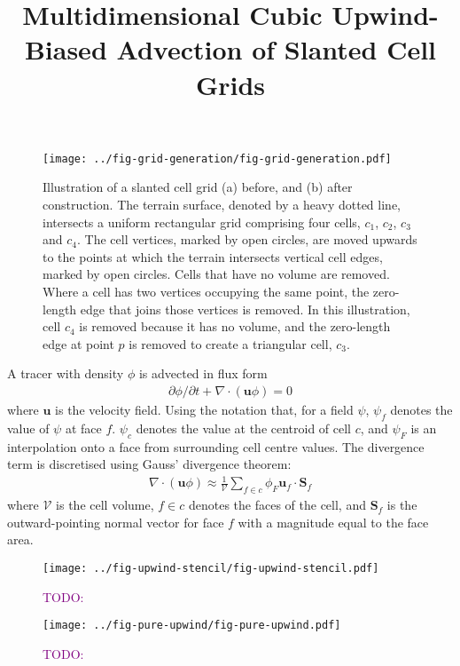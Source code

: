 \documentclass{article}
\title{Multidimensional Cubic Upwind-Biased Advection of Slanted Cell Grids}
\newcommand{\TODO}[1]{\textcolor{purple}{TODO: \emph{#1}}}
\begin{document}
\maketitle
\begin{figure}
	\centering
	\texttt{[image: ../fig-grid-generation/fig-grid-generation.pdf]}
	\caption{Illustration of a slanted cell grid (a) before, and (b) after construction.
	The terrain surface, denoted by a heavy dotted line, intersects a uniform rectangular grid comprising four cells, $c_1$, $c_2$, $c_3$ and $c_4$.  The cell vertices, marked by open circles, are moved upwards to the points at which the terrain intersects vertical cell edges, marked by open circles.  Cells that have no volume are removed.  Where a cell has two vertices occupying the same point, the zero-length edge that joins those vertices is removed.  In this illustration, cell $c_4$ is removed because it has no volume, and the zero-length edge at point $p$ is removed to create a triangular cell, $c_3$.}
	\label{fig:grid-generation}
\end{figure}

A tracer with density $\phi$ is advected in flux form
\begin{align}
\partial \phi / \partial t + \nabla \cdot \left( \mathbf{u} \phi \right) = 0
\end{align}
where $\mathbf{u}$ is the velocity field.  Using the notation that, for a field $\psi$, $\psi_f$ denotes the value of $\psi$ at face $f$.  $\psi_c$ denotes the value at the centroid of cell $c$, and $\psi_F$ is an interpolation onto a face from surrounding cell centre values.  The divergence term is discretised using Gauss' divergence theorem:
\begin{align}
	\nabla \cdot \left( \mathbf{u} \phi \right) \approx \frac{1}{\mathcal{V}} \sum_{f \in c} \phi_F \mathbf{u}_f \cdot \mathbf{S}_f
\end{align}
where $\mathcal{V}$ is the cell volume, $f \in c$ denotes the faces of the cell, and $\mathbf{S}_f$ is the outward-pointing normal vector for face $f$ with a magnitude equal to the face area.

\begin{figure}
	\centering
	\texttt{[image: ../fig-upwind-stencil/fig-upwind-stencil.pdf]}
	\caption{\TODO{}}
	\label{fig:upwind-stencil}
\end{figure}

\begin{figure}
	\centering
	\texttt{[image: ../fig-pure-upwind/fig-pure-upwind.pdf]}
	\caption{\TODO{}}
	\label{fig:pure-upwind}
\end{figure}
\end{document}
